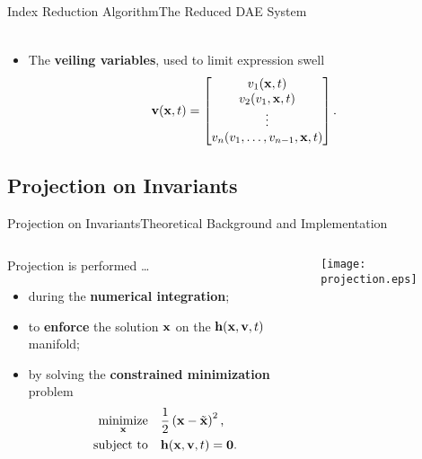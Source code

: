 \begin{frame}{Index Reduction Algorithm}{The Reduced \ac{DAE} System}
\begin{itemize}[<+->]
\begin{equation*}
\begin{array}{l}
    \end{array}
    \end{equation*}
    \item The \textbf{veiling variables}, used to limit expression swell
    \begin{equation*}
        \mathbf{v}(\mathbf{x}, t) = \begin{bmatrix}
            v_{1}(\mathbf{x}, t) \\
            v_{2}(v_{1}, \mathbf{x}, t) \\
            \vdots \\
            v_{n}(v_{1}, \dots, v_{n-1}, \mathbf{x}, t)
        \end{bmatrix} \text{.}
    \end{equation*}
  \end{itemize}
\end{frame}

\subsection{Projection on Invariants}

\begin{frame}{Projection on Invariants}{Theoretical Background and Implementation}
  \begin{columns}
    \begin{column}[c]{0.6\textwidth}
      Projection is performed \dots
      \begin{itemize}
        \item during the \textbf{numerical integration};
        \item to \textbf{enforce} the solution $\mathbf{x}$ on the $\mathbf{h}(\mathbf{x}, \mathbf{v}, t)$ manifold;
        \item by solving the \textbf{constrained minimization} problem
          \begin{align*}
            \underset{\mathbf{x}}{\text{minimize}} \quad &\dfrac{1}{2}\left(\mathbf{x} - \tilde{\mathbf{x}}\right)^2 \text{,} \\
            \text{subject to} \quad &\mathbf{h}(\mathbf{x}, \mathbf{v}, t) = \mathbf{0} \text{.}
          \end{align*}
        \end{itemize}
      \end{column}
      \begin{column}[c]{0.4\textwidth}
        \hspace{-0.2\textwidth}\texttt{[image: projection.eps]}
      \end{column}
    \end{columns}
    \vspace{1.0em}
\end{frame}

